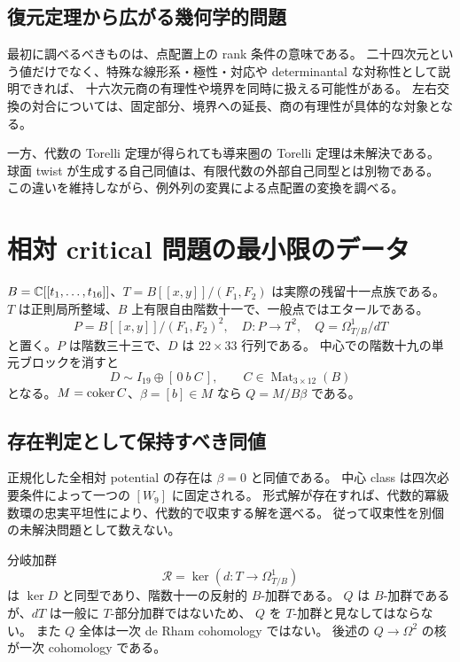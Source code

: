 \subsection{復元定理から広がる幾何学的問題}
最初に調べるべきものは、点配置上の rank 条件の意味である。
二十四次元という値だけでなく、特殊な線形系・極性・対応や determinantal な対称性として説明できれば、
十六次元商の有理性や境界を同時に扱える可能性がある。
左右交換の対合については、固定部分、境界への延長、商の有理性が具体的な対象となる。

一方、代数の Torelli 定理が得られても導来圏の Torelli 定理は未解決である。
球面 twist が生成する自己同値は、有限代数の外部自己同型とは別物である。
この違いを維持しながら、例外列の変異による点配置の変換を調べる。







\section{相対 critical 問題の最小限のデータ}

$B=\mathbb C[[t_1,\ldots,t_{16}]]$、$T=B[[x,y]]/(F_1,F_2)$ は実際の残留十一点族である。
$T$ は正則局所整域、$B$ 上有限自由階数十一で、一般点ではエタールである。
\[
 P=B[[x,y]]/(F_1,F_2)^2,\quad
 D:P\longrightarrow T^2,\quad
 Q=\Omega^1_{T/B}/dT
\]
と置く。$P$ は階数三十三で、$D$ は $22\times33$ 行列である。
中心での階数十九の単元ブロックを消すと
\[
 D\sim I_{19}\oplus[\,0\ b\ C\,],\qquad C\in\operatorname{Mat}_{3\times12}(B)
\]
となる。$M=\operatorname{coker} C$、$\beta=[b]\in M$ なら $Q=M/B\beta$ である。

\subsection{存在判定として保持すべき同値}
正規化した全相対 potential の存在は $\beta=0$ と同値である。
中心 class は四次必要条件によって一つの $[W_9]$ に固定される。
形式解が存在すれば、代数的冪級数環の忠実平坦性により、代数的で収束する解を選べる。
従って収束性を別個の未解決問題として数えない。

分岐加群
\[
 \mathscr R=\ker(d:T\to\Omega^1_{T/B})
\]
は $\ker D$ と同型であり、階数十一の反射的 $B$-加群である。
$Q$ は $B$-加群であるが、$dT$ は一般に $T$-部分加群ではないため、
$Q$ を $T$-加群と見なしてはならない。
また $Q$ 全体は一次 de Rham cohomology ではない。
後述の $Q\to\Omega^2$ の核が一次 cohomology である。

